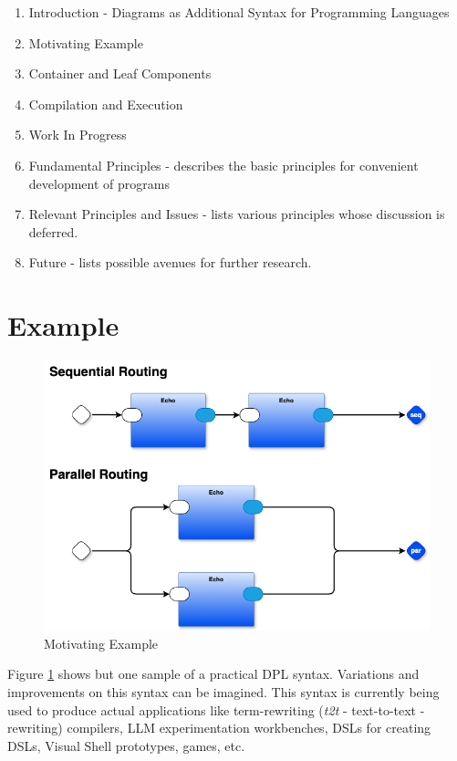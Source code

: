 \documentclass[10pt,anonymous,review]{acmart}
\begin{document}
\begin{enumerate}
\item Introduction - Diagrams as Additional Syntax for Programming
Languages

\item Motivating Example

\item Container and Leaf Components

\item Compilation and Execution

\item Work In Progress

\item Fundamental Principles - describes the basic principles
for convenient development of programs

\item Relevant Principles and Issues - lists various
principles whose discussion is deferred.

\item Future - lists possible avenues for further research.

\end{enumerate}

\section{Example}

  \begin{figure}[h]
    \centering
    \includegraphics[width=0.8\linewidth]{./media/HelloWorld0D.png}
    \caption{Motivating Example}
    \label{mot}
  \end{figure}

Figure \ref{mot} shows but one sample of a practical DPL syntax. Variations and
improvements on this syntax can be imagined. This syntax is currently being used
to produce actual applications like term-rewriting (\emph{t2t} -
text-to-text - rewriting) compilers, LLM experimentation workbenches, DSLs for creating DSLs,
Visual Shell prototypes, games, etc.
\end{document}
